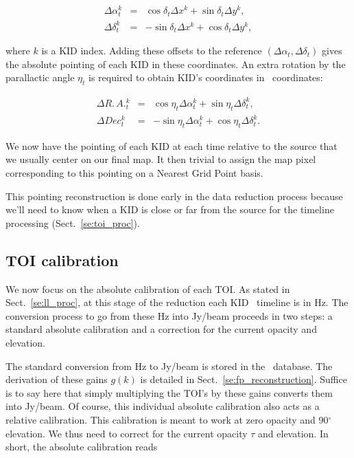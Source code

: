 \begin{eqnarray}
\Delta\alpha^k_t &=&  \cos\delta_t \Delta x^k + \sin\delta_t \Delta y^k, \nonumber\\
\Delta\delta^k_t &=& -\sin\delta_t \Delta x^k + \cos\delta_t \Delta y^k, \nonumber
\end{eqnarray}

where $k$ is a KID index. Adding these offsets to the reference $(\Delta
\alpha_t, \Delta \delta_t)$ gives the absolute pointing of each KID in these
coordinates. An extra rotation by the parallactic angle $\eta_t$ is required to
obtain KID's coordinates in \radec\ coordinates:

\begin{eqnarray}
\Delta R.\,A.^k_t &=&  \cos\eta_t \Delta\alpha^k_t + \sin\eta_t \Delta\delta^k_t,\\
\Delta Dec^k_t    &=& -\sin\eta_t \Delta\alpha^k_t + \cos\eta_t \Delta\delta^k_t.
\end{eqnarray}

We now have the pointing of each KID at each time relative to the source that we
usually center on our final map. It then trivial to assign the map pixel
corresponding to this pointing on a Nearest Grid Point basis.

This pointing reconstruction is done early in the data reduction process because
we'll need to know when a KID is close or far from the source for the timeline
processing (Sect.~\ref{se:toi_proc}).

\subsection{TOI calibration}
\label{se:flux_calib}

We now focus on the absolute calibration of each TOI. As stated in
Sect.~\ref{se:ll_proc}, at this stage of the reduction each KID \rf~timeline is
in Hz. The conversion process to go from these Hz into Jy/beam proceeds in two
steps: a standard absolute calibration and a correction for the current opacity
and elevation.

The standard conversion from Hz to Jy/beam is stored in the
\kidpar\ database. The derivation of these gains $g(k)$ is detailed in
Sect.~\ref{se:fp_reconstruction}. Suffice is to say here that simply multiplying
the TOI's by these gains converts them into Jy/beam. Of course, this individual
absolute calibration also acts as a relative calibration. This calibration is
meant to work at zero opacity and 90$^\circ$ elevation. We thus need to correct
for the current opacity $\tau$ and elevation. In short, the absolute calibration reads

